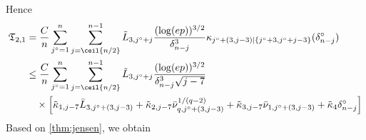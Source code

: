 \documentclass[aos]{imsart}
\begin{document}
\begin{appendix}
Hence
\begin{equation*}
\begin{aligned}
    \mathfrak{T}_{2,1} 
    & = \frac{C}{n} \sum_{j^\circ=1}^{n} \sum_{j=\ceil{n/2}}^{n-1} \tilde L_{3,j^\circ+j} \frac{(\log(ep))^{3/2}}{\delta_{n-j}^3} 
    \kappa_{j^\circ+(3,j-3)|\{j^\circ+3,j^\circ+j-3\}}(\delta_{n-j}^\circ)
    \\
    & \leq \frac{C}{n} \sum_{j^\circ=1}^{n} \sum_{j=\ceil{n/2}}^{n-1} \tilde L_{3,j^\circ+j} \frac{(\log(ep))^{3/2}}{\delta_{n-j}^3 \sqrt{j-7}} \\
    & \quad \times \left[ \begin{aligned}
        & \tilde\kappa_{1,j-7} \bar{L}_{3,j^\circ+(3,j-3)}
        + \tilde\kappa_{2,j-7} \bar\nu_{q,j^\circ+(3,j-3)}^{1/(q-2)}
        + \tilde\kappa_{3,j-7} \bar\nu_{1,j^\circ+(3,j-3)}
        + \tilde\kappa_{4} \delta_{n-j}^\circ \\
    \end{aligned} \right] \\
\end{aligned}
\end{equation*}
Based on \cref{thm:jensen}, we obtain
\begin{equation*}
\begin{aligned}

\end{aligned}
\end{equation*}
\end{appendix}
\end{document}
